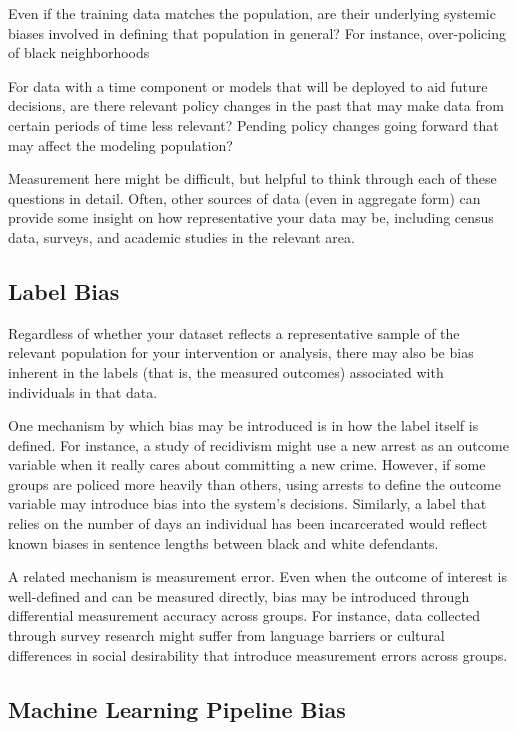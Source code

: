 \documentclass[]{krantz}
\begin{document}
Even if the training data matches the population, are their underlying
systemic biases involved in defining that population in general? For
instance, over-policing of black neighborhoods

For data with a time component or models that will be deployed to aid
future decisions, are there relevant policy changes in the past that may
make data from certain periods of time less relevant? Pending policy
changes going forward that may affect the modeling population?

Measurement here might be difficult, but helpful to think through each
of these questions in detail. Often, other sources of data (even in
aggregate form) can provide some insight on how representative your data
may be, including census data, surveys, and academic studies in the
relevant area.

\subsection{Label Bias}\label{label-bias}

Regardless of whether your dataset reflects a representative sample of
the relevant population for your intervention or analysis, there may
also be bias inherent in the labels (that is, the measured outcomes)
associated with individuals in that data.

One mechanism by which bias may be introduced is in how the label itself
is defined. For instance, a study of recidivism might use a new arrest
as an outcome variable when it really cares about committing a new
crime. However, if some groups are policed more heavily than others,
using arrests to define the outcome variable may introduce bias into the
system's decisions. Similarly, a label that relies on the number of days
an individual has been incarcerated would reflect known biases in
sentence lengths between black and white defendants.

A related mechanism is measurement error. Even when the outcome of
interest is well-defined and can be measured directly, bias may be
introduced through differential measurement accuracy across groups. For
instance, data collected through survey research might suffer from
language barriers or cultural differences in social desirability that
introduce measurement errors across groups.

\hypertarget{sec:mlbiasexamples}{\subsection{Machine Learning Pipeline
Bias}\label{sec:mlbiasexamples}}
\end{document}
